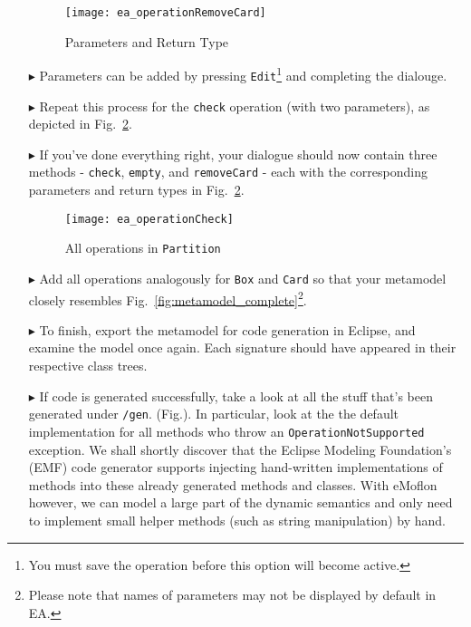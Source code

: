 \begin{enumerate}
\begin{figure}[htbp]
	\centering
  \texttt{[image: ea\_operationRemoveCard]}
	\caption{Parameters and Return Type}
	\label{fig:operation_parameters}
\end{figure}

\item[$\blacktriangleright$] Parameters can be added by pressing \texttt{Edit}\footnote{You must save the operation before this option will become active.} and
completing the dialouge.

\item[$\blacktriangleright$] Repeat this process for the \texttt{check} operation (with two parameters), as depicted in Fig.~\ref{fig:operation_partition}. 

\item[$\blacktriangleright$] If you've done everything right, your dialogue should now contain three methods - \texttt{check}, \texttt{empty}, and
\texttt{removeCard} - each with the corresponding parameters and return types in Fig.~\ref{fig:operation_partition}.

\begin{figure}[htbp]
	\centering
  \texttt{[image: ea\_operationCheck]}
	\caption{All operations in \texttt{Partition}}
	\label{fig:operation_partition}
\end{figure}

\item[$\blacktriangleright$] Add all operations analogously for \texttt{Box} and \texttt{Card} so that your metamodel closely resembles
Fig.~\ref{fig:metamodel_complete}\footnote{Please note that names of parameters may not be displayed by default in EA.}.

\item[$\blacktriangleright$] To finish, export the metamodel for code generation in Eclipse, and examine the model once again. Each signature should have
appeared in their respective class trees.

\item[$\blacktriangleright$]  If code is generated successfully, take a look at all the stuff that's been generated under \texttt{/gen}. (Fig.). In particular,
look at the the default implementation for all methods who throw an \texttt{OperationNotSupported} exception. We shall shortly discover that the Eclipse
Modeling Foundation's (EMF) code generator supports injecting hand-written implementations of methods into these already generated methods and classes.
With eMoflon however, we can model a large part of the dynamic semantics and only need to implement small helper methods (such as string manipulation) by
hand.


\end{enumerate}
